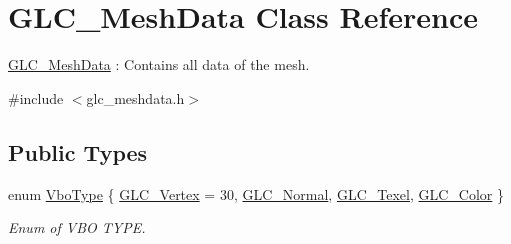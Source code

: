 \hypertarget{class_g_l_c___mesh_data}{\section{G\-L\-C\-\_\-\-Mesh\-Data Class Reference}
\label{class_g_l_c___mesh_data}
}


\hyperlink{class_g_l_c___mesh_data}{G\-L\-C\-\_\-\-Mesh\-Data} \-: Contains all data of the mesh.  




{\ttfamily \#include $<$glc\-\_\-meshdata.\-h$>$}

\subsection*{Public Types}
\begin{DoxyCompactItemize}
\item 
enum \hyperlink{class_g_l_c___mesh_data_aad6ad4c9ec9e7350c0e62cfcb1a95d48}{Vbo\-Type} \{ \hyperlink{class_g_l_c___mesh_data_aad6ad4c9ec9e7350c0e62cfcb1a95d48ae39ab1843150d960bc5fde771fe57e5b}{G\-L\-C\-\_\-\-Vertex} = 30, 
\hyperlink{class_g_l_c___mesh_data_aad6ad4c9ec9e7350c0e62cfcb1a95d48a1d6b9afe07bbb4eec9e65f204177dab3}{G\-L\-C\-\_\-\-Normal}, 
\hyperlink{class_g_l_c___mesh_data_aad6ad4c9ec9e7350c0e62cfcb1a95d48a0205d7ad502d0cdf50f4d0689ed642a4}{G\-L\-C\-\_\-\-Texel}, 
\hyperlink{class_g_l_c___mesh_data_aad6ad4c9ec9e7350c0e62cfcb1a95d48a63ef84b91edc0dbd7d70676819e640d0}{G\-L\-C\-\_\-\-Color}
 \}
\begin{DoxyCompactList}\small\item\em Enum of V\-B\-O T\-Y\-P\-E. \end{DoxyCompactList}\end{DoxyCompactItemize}
